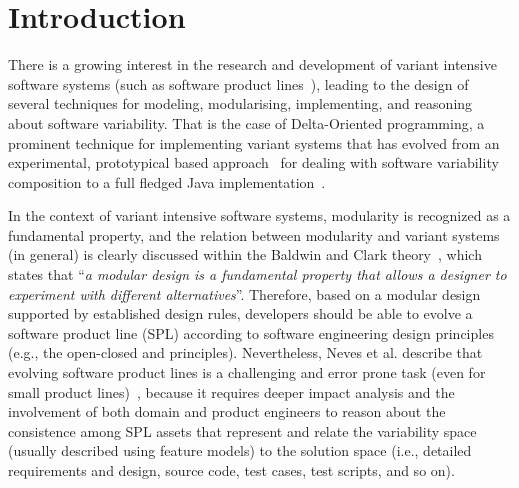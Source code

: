 \vspace{-6pt}

\section{Introduction}

There is a growing interest in the research and 
development of variant intensive software systems (such as
software product lines~\cite{}), leading to the design of several techniques for
modeling, modularising, implementing,
and reasoning about software variability. That is the case of
Delta-Oriented programming,  a prominent technique for implementing
variant systems that has evolved from an experimental,
prototypical based approach~\cite{schaeger-splc2010}
for dealing with software variability composition 
to a full fledged Java implementation~\cite{koscielny-ppj14}.

In the context of variant intensive software systems,
modularity is recognized as a fundamental property, and the
relation between modularity and variant systems (in general)
is clearly discussed within the Baldwin and Clark theory~\cite{dr-book}, which states that ``\emph{a modular 
design is a fundamental property that allows a designer to experiment 
with different alternatives}''.  Therefore, based on a modular design supported
by established design rules, developers should be able to evolve a
software product line (SPL) according to software engineering
design principles (e.g., the open-closed and principles). Nevertheless, Neves et al. describe that
evolving software product lines is a challenging and error prone task (even for
small product lines)~\cite{neves-gpce2011}, because it requires deeper impact analysis and
the involvement of both domain and product engineers to reason about
the consistence among SPL assets that represent and relate the
variability space (usually described using feature models) to the solution space (i.e.,
detailed requirements and design, source code, test cases, test scripts, and so on).

